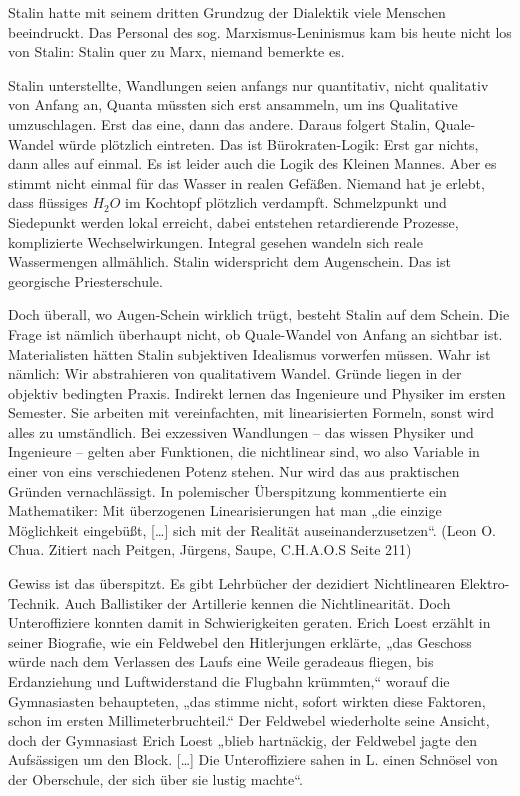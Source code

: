 \documentclass[11pt,a4paper]{article}
\begin{document}
Stalin hatte mit seinem dritten Grundzug der Dialektik viele Menschen
beeindruckt. Das Personal des sog. Marxismus-Leninismus kam bis heute nicht
los von Stalin: Stalin quer zu Marx, niemand bemerkte es.

Stalin unterstellte, Wandlungen seien anfangs nur quantitativ, nicht
qualitativ von Anfang an, Quanta müssten sich erst ansammeln, um ins
Qualitative umzuschlagen. Erst das eine, dann das andere. Daraus folgert
Stalin, Quale-Wandel würde plötzlich eintreten. Das ist Bürokraten-Logik: Erst
gar nichts, dann alles auf einmal. Es ist leider auch die Logik des Kleinen
Mannes. Aber es stimmt nicht einmal für das Wasser in realen Gefäßen. Niemand
hat je erlebt, dass flüssiges $H_2O$ im Kochtopf plötzlich verdampft.
Schmelzpunkt und Siedepunkt werden lokal erreicht, dabei entstehen
retardierende Prozesse, komplizierte Wechselwirkungen. Integral gesehen
wandeln sich reale Wassermengen allmählich. Stalin widerspricht dem
Augenschein.  Das ist georgische Priesterschule.

Doch überall, wo Augen-Schein wirklich trügt, besteht Stalin auf dem Schein.
Die Frage ist nämlich überhaupt nicht, ob Quale-Wandel von Anfang an sichtbar
ist. Materialisten hätten Stalin subjektiven Idealismus vorwerfen müssen. Wahr
ist nämlich: Wir abstrahieren von qualitativem Wandel. Gründe liegen in der
objektiv bedingten Praxis. Indirekt lernen das Ingenieure und Physiker im
ersten Semester. Sie arbeiten mit vereinfachten, mit linearisierten Formeln,
sonst wird alles zu umständlich. Bei exzessiven Wandlungen – das wissen
Physiker und Ingenieure – gelten aber Funktionen, die nichtlinear sind, wo
also Variable in einer von eins verschiedenen Potenz stehen. Nur wird das aus
praktischen Gründen vernachlässigt. In polemischer Überspitzung kommentierte
ein Mathematiker: Mit überzogenen Linearisierungen hat man „die einzige
Möglichkeit eingebüßt, [\ldots] sich mit der Realität auseinanderzusetzen“.
(Leon O. Chua. Zitiert nach Peitgen, Jürgens, Saupe, C.H.A.O.S Seite 211)

Gewiss ist das überspitzt. Es gibt Lehrbücher der dezidiert Nichtlinearen
Elektro-Technik. Auch Ballistiker der Artillerie kennen die Nichtlinearität.
Doch Unteroffiziere konnten damit in Schwierigkeiten geraten. Erich Loest
erzählt in seiner Biografie, wie ein Feldwebel den Hitlerjungen erklärte, „das
Geschoss würde nach dem Verlassen des Laufs eine Weile geradeaus fliegen, bis
Erdanziehung und Luftwiderstand die Flugbahn krümmten,“ worauf die
Gymnasiasten behaupteten, „das stimme nicht, sofort wirkten diese Faktoren,
schon im ersten Millimeterbruchteil.“ Der Feldwebel wiederholte seine Ansicht,
doch der Gymnasiast Erich Loest „blieb hartnäckig, der Feldwebel jagte den
Aufsässigen um den Block. [\ldots] Die Unteroffiziere sahen in L. einen
Schnösel von der Oberschule, der sich über sie lustig machte“.
\end{document}
